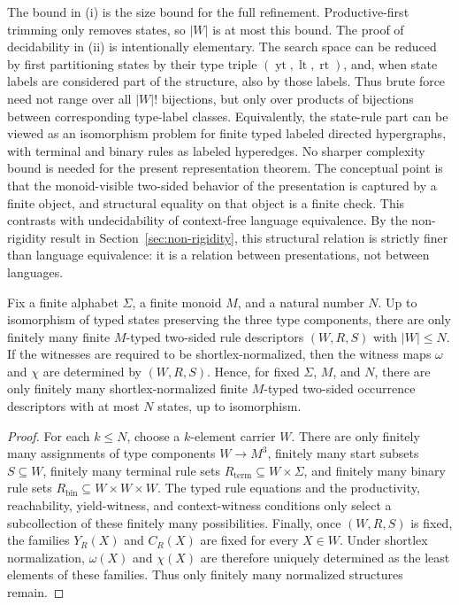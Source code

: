 \documentclass[sub]{jalc}
\newcommand{\yt}{\operatorname{yt}}
\newcommand{\lt}{\operatorname{lt}}
\newcommand{\rt}{\operatorname{rt}}
\begin{document}
\begin{remark}
The bound in (i) is the size bound for the full refinement. Productive-first trimming only removes states, so \(|W|\) is at most this bound. The proof of decidability in (ii) is intentionally elementary. The search space can be reduced by first partitioning states by their type triple \((\yt,\lt,\rt)\), and, when state labels are considered part of the structure, also by those labels. Thus brute force need not range over all \(|W|!\) bijections, but only over products of bijections between corresponding type-label classes. Equivalently, the state-rule part can be viewed as an isomorphism problem for finite typed labeled directed hypergraphs, with terminal and binary rules as labeled hyperedges. No sharper complexity bound is needed for the present representation theorem. The conceptual point is that the monoid-visible two-sided behavior of the presentation is captured by a finite object, and structural equality on that object is a finite check. This contrasts with undecidability of context-free language equivalence. By the non-rigidity result in Section~\ref{sec:non-rigidity}, this structural relation is strictly finer than language equivalence: it is a relation between presentations, not between languages.
\end{remark}

\begin{proposition}
\label{prop:finite-bounded-descriptor-space}
Fix a finite alphabet \(\Sigma\), a finite monoid \(M\), and a natural number
\(N\). Up to isomorphism of typed states preserving the three type components,
there are only finitely many finite \(M\)-typed two-sided rule descriptors
\((W,R,S)\) with \(|W|\leq N\). If the witnesses are required to be
shortlex-normalized, then the witness maps \(\omega\) and \(\chi\) are
determined by \((W,R,S)\). Hence, for fixed \(\Sigma\), \(M\), and \(N\), there
are only finitely many shortlex-normalized finite \(M\)-typed two-sided occurrence
descriptors with at most \(N\) states, up to isomorphism.
\end{proposition}

\begin{proof}
For each \(k\leq N\), choose a \(k\)-element carrier \(W\). There are only
finitely many assignments of type components \(W\to M^3\), finitely many start
subsets \(S\subseteq W\), finitely many terminal rule sets
\(R_{\mathrm{term}}\subseteq W\times\Sigma\), and finitely many binary rule
sets \(R_{\mathrm{bin}}\subseteq W\times W\times W\). The typed rule equations
and the productivity, reachability, yield-witness, and context-witness
conditions only select a subcollection of these finitely many possibilities.
Finally, once \((W,R,S)\) is fixed, the families \(Y_R(X)\) and \(C_R(X)\) are
fixed for every \(X\in W\). Under shortlex normalization, \(\omega(X)\) and
\(\chi(X)\) are therefore uniquely determined as the least elements of these
families. Thus only finitely many normalized structures remain.
\end{proof}
\end{document}
